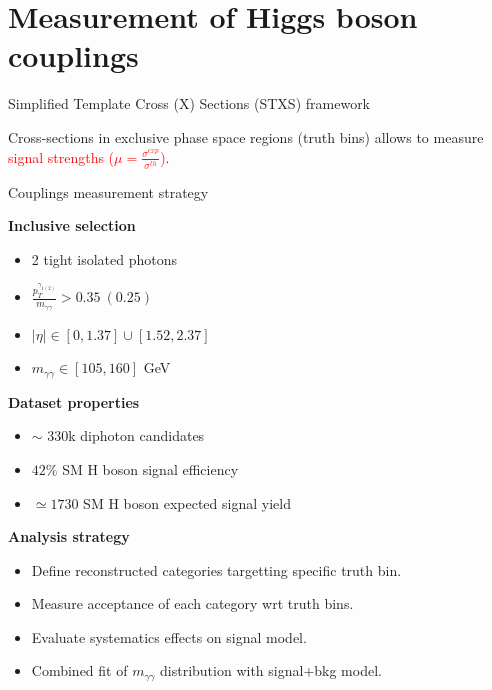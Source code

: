\section{Measurement of Higgs boson couplings}
\frame{\tableofcontents[currentsection]}

\begin{frame}{Simplified Template Cross (X) Sections (STXS) framework}
  \centering
      
      Cross-sections in exclusive phase space regions (truth bins) allows to measure \textcolor{red}{signal strengths ($\mu=\frac{\sigma^{exp}}{\sigma^{th}}$)}.
  
\end{frame}
\begin{frame}{Couplings measurement strategy}

  \begin{minipage}{0.49\linewidth}
  {\bf Inclusive selection }
  \begin{itemize}
  \item 2 tight isolated photons
  \item $\frac{p_T^{\gamma_{1(2)}}}{m_{\gamma\gamma}} > 0.35~ (0.25)$
  \item $|\eta|\in [0, 1.37]  \cup [1.52, 2.37]$
  \item $m_{\gamma\gamma} \in [105, 160]$ GeV
  \end{itemize}
  \end{minipage}
  \hfill
  \begin{minipage}{0.49\linewidth}
    {\bf Dataset properties}  

    \begin{itemize}
    \item $\sim$ 330k diphoton candidates
    \item $42\%$ SM H boson signal efficiency
    \item $\simeq 1730$ SM H boson expected signal yield
    \end{itemize}
  \end{minipage}
  \vfill
  {\bf Analysis strategy } 
  \begin{itemize}
  \item Define reconstructed categories targetting specific truth bin.
  \item Measure acceptance of each category wrt truth bins.
  \item Evaluate systematics effects on signal model.
  \item Combined fit of $m_{\gamma\gamma}$ distribution with signal+bkg model.
  \end{itemize}

\end{frame}

